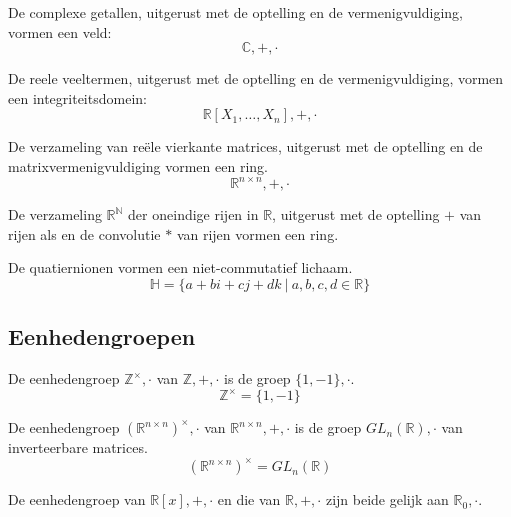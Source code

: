 \documentclass[main.tex]{subfiles}
\begin{document}
\begin{vb}
  De complexe getallen, uitgerust met de optelling en de vermenigvuldiging, vormen een veld:
  \[ \mathbb{C},+,\cdot \]
  \commj {} \domein \lichaam \veld
\end{vb}

\begin{vb}
  De reele veeltermen, uitgerust met de optelling en de vermenigvuldiging, vormen een integriteitsdomein: 
  \[ \mathbb{R}[X_{1},\dotsc,X_{n}],+,\cdot \]
  \commj {} \domein
\end{vb}

\begin{vb}
  De verzameling van re\"ele vierkante matrices, uitgerust met de optelling en de matrixvermenigvuldiging vormen een ring. 
  \[ \mathbb{R}^{n\times n},+,\cdot \]
  \commn {}
\end{vb}

\begin{vb}
  De verzameling $\mathbb{R}^{\mathbb{N}}$ der oneindige rijen in $\mathbb{R}$, uitgerust met de optelling $+$ van rijen als en de convolutie $*$ van rijen vormen een ring.\\
   \commj
\end{vb}

\begin{vb}
  De quatiernionen vormen een niet-commutatief lichaam.
  \[ \mathbb{H} = \{ a + bi + cj + dk \ |\ a,b,c,d \in \mathbb{R} \} \]
  \commn {} \lichaam 
\end{vb}

\subsection{Eenhedengroepen}
\label{sec:eenhedengroepen}

\begin{vb}
  De eenhedengroep $\mathbb{Z}^{\times},\cdot$ van $\mathbb{Z},+,\cdot$ is de groep $\{1,-1\},\cdot$.
  \[ \mathbb{Z}^{\times} = \{1,-1\}\]
\end{vb}

\begin{vb}
  De eenhedengroep $(\mathbb{R}^{n\times n})^{\times},\cdot$ van $\mathbb{R}^{n\times n},+,\cdot$ is de groep $GL_{n}(\mathbb{R}),\cdot$ van inverteerbare matrices.
  \[ (\mathbb{R}^{n\times n})^{\times} = GL_{n}(\mathbb{R}) \]
\end{vb}

\begin{vb}
  De eenhedengroep van $\mathbb{R}[x],+,\cdot$ en die van $\mathbb{R},+,\cdot$ zijn beide gelijk aan  $\mathbb{R}_{0},\cdot$.
\end{vb}
\end{document}
